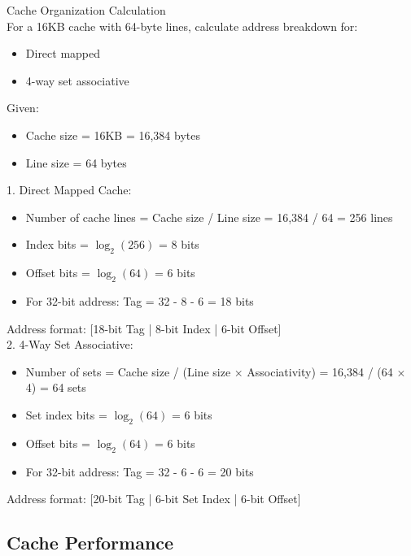 \begin{example2}{Cache Organization Calculation}\\
For a 16KB cache with 64-byte lines, calculate address breakdown for:
\begin{itemize}
\item Direct mapped
\item 4-way set associative
\end{itemize}
\tcblower
Given:
\begin{itemize}
    \item Cache size = 16KB = 16,384 bytes
    \item Line size = 64 bytes
\end{itemize}

1. Direct Mapped Cache:
\begin{itemize}
    \item Number of cache lines = Cache size / Line size = 16,384 / 64 = 256 lines
    \item Index bits = $\log_2(256)$ = 8 bits
    \item Offset bits = $\log_2(64)$ = 6 bits
    \item For 32-bit address: Tag = 32 - 8 - 6 = 18 bits
\end{itemize}
Address format: [18-bit Tag | 8-bit Index | 6-bit Offset]
\vspace{2mm}\\
2. 4-Way Set Associative:
\begin{itemize}
    \item Number of sets = Cache size / (Line size × Associativity) = 16,384 / (64 × 4) = 64 sets
    \item Set index bits = $\log_2(64)$ = 6 bits
    \item Offset bits = $\log_2(64)$ = 6 bits
    \item For 32-bit address: Tag = 32 - 6 - 6 = 20 bits
\end{itemize}   
Address format: [20-bit Tag | 6-bit Set Index | 6-bit Offset]
\end{example2}

\subsection{Cache Performance}

